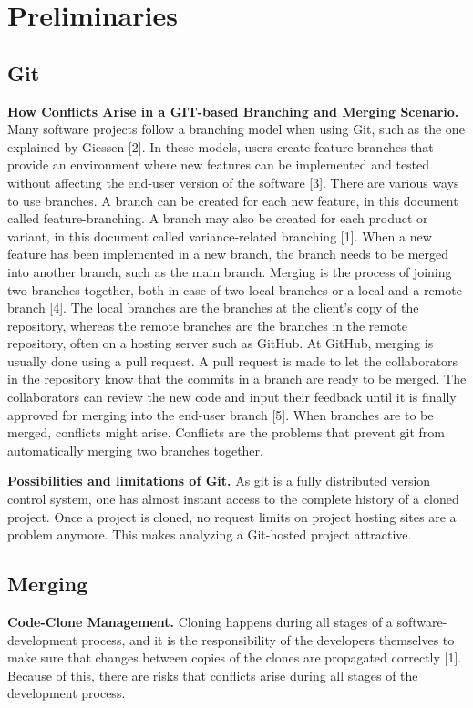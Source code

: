 \chapter{Preliminaries}
\section{Git}
\textbf{How Conflicts Arise in a GIT-based Branching and Merging Scenario.} Many software projects follow a branching model when using Git, such as the one explained by Giessen [2]. In these models, users create feature branches that provide an environment where new features can be implemented and tested without affecting the end-user version of the software [3]. There are various ways to use branches. A branch can be created for each new feature, in this document called feature-branching. A branch may also be created for each product or variant, in this document called variance-related branching [1]. When a new feature has been implemented in a new branch, the branch needs to be merged into another branch, such as the main branch. Merging is the process of joining two branches together, both in case of two local branches or a local and a remote branch [4]. The local branches are the branches at the client’s copy of the repository, whereas the remote branches are the branches in the remote repository, often on a hosting server such as GitHub. At GitHub, merging is usually done using a pull request. A pull request is made to let the collaborators in the repository know that the commits in a branch are ready to be merged. The collaborators can review the new code and input their feedback until it is finally approved for merging into the end-user branch [5]. When branches are to be merged, conflicts might arise. Conflicts are the problems that prevent git from automatically merging two branches together.

\textbf{Possibilities and limitations of Git.} As git is a fully distributed version control system, one has almost instant access to the complete history of a cloned project. Once a project is cloned, no request limits on project hosting sites are a problem anymore. This makes analyzing a Git-hosted project attractive.

\section{Merging}
\textbf{Code-Clone Management.} Cloning happens during all stages of a software-development process, and it is the responsibility of the developers themselves to make sure that changes between copies of the clones are propagated correctly [1]. Because of this, there are risks that conflicts arise during all stages of the development process.

